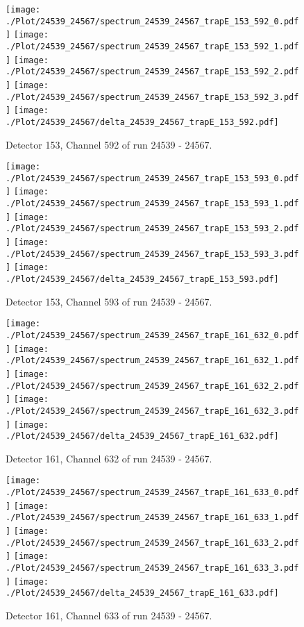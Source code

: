 \clearpage
\begin{figure}[hb]
\centering
\texttt{[image: ./Plot/24539\_24567/spectrum\_24539\_24567\_trapE\_153\_592\_0.pdf]}
\texttt{[image: ./Plot/24539\_24567/spectrum\_24539\_24567\_trapE\_153\_592\_1.pdf]}
\texttt{[image: ./Plot/24539\_24567/spectrum\_24539\_24567\_trapE\_153\_592\_2.pdf]}
\texttt{[image: ./Plot/24539\_24567/spectrum\_24539\_24567\_trapE\_153\_592\_3.pdf]}
\texttt{[image: ./Plot/24539\_24567/delta\_24539\_24567\_trapE\_153\_592.pdf]}
\caption{ Detector 153, Channel 592 of run 24539 - 24567.}
\label{fig:24539_24567_trapE_153_592}
\end{figure}
\clearpage
\begin{figure}[hb]
\centering
\texttt{[image: ./Plot/24539\_24567/spectrum\_24539\_24567\_trapE\_153\_593\_0.pdf]}
\texttt{[image: ./Plot/24539\_24567/spectrum\_24539\_24567\_trapE\_153\_593\_1.pdf]}
\texttt{[image: ./Plot/24539\_24567/spectrum\_24539\_24567\_trapE\_153\_593\_2.pdf]}
\texttt{[image: ./Plot/24539\_24567/spectrum\_24539\_24567\_trapE\_153\_593\_3.pdf]}
\texttt{[image: ./Plot/24539\_24567/delta\_24539\_24567\_trapE\_153\_593.pdf]}
\caption{ Detector 153, Channel 593 of run 24539 - 24567.}
\label{fig:24539_24567_trapE_153_593}
\end{figure}
\clearpage
\begin{figure}[hb]
\centering
\texttt{[image: ./Plot/24539\_24567/spectrum\_24539\_24567\_trapE\_161\_632\_0.pdf]}
\texttt{[image: ./Plot/24539\_24567/spectrum\_24539\_24567\_trapE\_161\_632\_1.pdf]}
\texttt{[image: ./Plot/24539\_24567/spectrum\_24539\_24567\_trapE\_161\_632\_2.pdf]}
\texttt{[image: ./Plot/24539\_24567/spectrum\_24539\_24567\_trapE\_161\_632\_3.pdf]}
\texttt{[image: ./Plot/24539\_24567/delta\_24539\_24567\_trapE\_161\_632.pdf]}
\caption{ Detector 161, Channel 632 of run 24539 - 24567.}
\label{fig:24539_24567_trapE_161_632}
\end{figure}
\clearpage
\begin{figure}[hb]
\centering
\texttt{[image: ./Plot/24539\_24567/spectrum\_24539\_24567\_trapE\_161\_633\_0.pdf]}
\texttt{[image: ./Plot/24539\_24567/spectrum\_24539\_24567\_trapE\_161\_633\_1.pdf]}
\texttt{[image: ./Plot/24539\_24567/spectrum\_24539\_24567\_trapE\_161\_633\_2.pdf]}
\texttt{[image: ./Plot/24539\_24567/spectrum\_24539\_24567\_trapE\_161\_633\_3.pdf]}
\texttt{[image: ./Plot/24539\_24567/delta\_24539\_24567\_trapE\_161\_633.pdf]}
\caption{ Detector 161, Channel 633 of run 24539 - 24567.}
\label{fig:24539_24567_trapE_161_633}
\end{figure}
